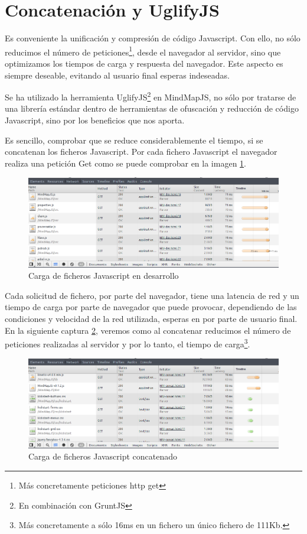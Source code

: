 \section{Concatenación y UglifyJS}
Es conveniente la unificación y compresión de código Javascript. Con ello, no sólo reducimos el número de peticiones\footnote{Más concretamente peticiones http get}, desde el navegador al servidor, sino que optimizamos los tiempos de carga y respuesta del navegador. Este aspecto es siempre deseable, evitando al usuario final esperas indeseadas.  

Se ha utilizado la herramienta UglifyJS\footnote{En combinación con GruntJS} en MindMapJS, no sólo por tratarse de una librería estándar dentro de herramientas de ofuscación y reducción de código Javascript, sino por los beneficios que nos aporta.

Es sencillo, comprobar que se reduce considerablemente el tiempo, si se concatenan los ficheros Javascript. Por cada fichero Javascript el navegador realiza una petición Get como se puede comprobar en la imagen \ref{fig:carga-desarrollo}.  

\begin{figure}[tbph]
\centering
\includegraphics[width=0.9\linewidth]{imagenes/Uglify1.png}
\caption{Carga de ficheros Javascript en desarrollo}
\label{fig:carga-desarrollo}
\end{figure}

Cada solicitud de fichero, por parte del navegador, tiene una latencia de red y un tiempo de carga por parte de navegador que puede provocar, dependiendo de las condiciones y velocidad de la red utilizada, esperas en por parte de usuario final. En la siguiente captura \ref{fig:carga-concatenado}, veremos como al concatenar reducimos el número de peticiones realizadas al servidor y por lo tanto, el tiempo de carga\footnote{Más concretamente a sólo 16ms en un fichero un único fichero de 111Kb.}.

\begin{figure}[tbph]
\centering
\includegraphics[width=0.9\linewidth]{imagenes/Uglify2.png}
\caption{Carga de ficheros Javascript concatenado}
\label{fig:carga-concatenado}
\end{figure}

